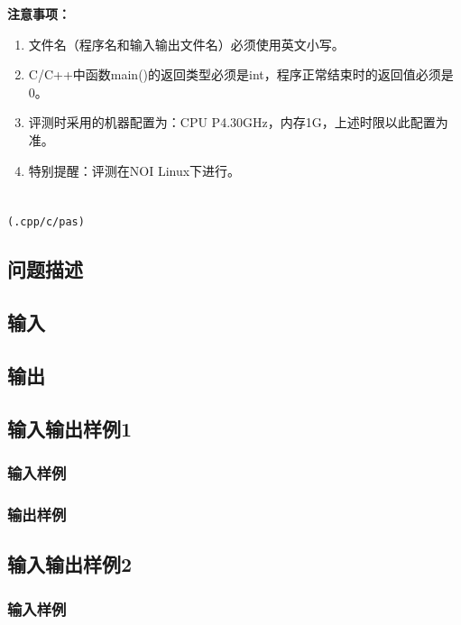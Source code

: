 \documentclass[UTF8]{ctexart}
\begin{document}
\textbf{注意事项：}
\begin{enumerate}
    \item{文件名（程序名和输入输出文件名）必须使用英文小写。}
    \item{C/C++中函数main()的返回类型必须是int，程序正常结束时的返回值必须是0。}
    \item{评测时采用的机器配置为：CPU P4.30GHz，内存1G，上述时限以此配置为准。}
    \item{特别提醒：评测在NOI Linux下进行。}
\end{enumerate}

\newpage
\setcounter{page}{1}
\pagestyle{plain}

\newpage
\section{}
\begin{center}
\tt\large{(.cpp/c/pas)}
\end{center}
\subsection{问题描述}

\subsection{输入}
\subsection{输出}

\subsection{输入输出样例1}
\subsubsection{输入样例}
\subsubsection{输出样例}

\subsection{输入输出样例2}
\subsubsection{输入样例}
\end{document}
